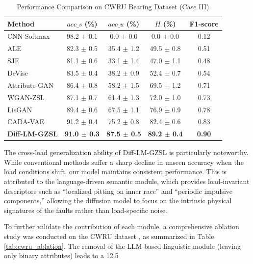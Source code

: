 \begin{table}[ht]
\centering
\caption{Performance Comparison on CWRU Bearing Dataset (Case III)}
\label{tab:cwru_results}
\begin{tabular}{lcccc}
\hline
Method & $acc\_s$ (\%) & $acc\_u$ (\%) & $H$ (\%) & F1-score \\ \hline
CNN-Softmax & 98.2 $\pm$ 0.1 & 0.0 $\pm$ 0.0 & 0.0 $\pm$ 0.0 & 0.12 \\
ALE & 82.3 $\pm$ 0.5 & 35.4 $\pm$ 1.2 & 49.5 $\pm$ 0.8 & 0.51 \\
SJE & 81.1 $\pm$ 0.6 & 33.1 $\pm$ 1.4 & 47.0 $\pm$ 1.1 & 0.48 \\
DeVise & 83.5 $\pm$ 0.4 & 38.2 $\pm$ 0.9 & 52.4 $\pm$ 0.7 & 0.54 \\
Attribute-GAN & 86.4 $\pm$ 0.8 & 58.2 $\pm$ 1.5 & 69.5 $\pm$ 1.2 & 0.71 \\
WGAN-ZSL & 87.1 $\pm$ 0.7 & 61.4 $\pm$ 1.3 & 72.0 $\pm$ 1.0 & 0.73 \\
LisGAN & 89.4 $\pm$ 0.6 & 67.5 $\pm$ 1.1 & 76.9 $\pm$ 0.9 & 0.78 \\
CADA-VAE & 91.2 $\pm$ 0.4 & 75.2 $\pm$ 0.8 & 82.4 $\pm$ 0.6 & 0.83 \\
\textbf{Diff-LM-GZSL} & \textbf{91.0 $\pm$ 0.3} & \textbf{87.5 $\pm$ 0.5} & \textbf{89.2 $\pm$ 0.4} & \textbf{0.90} \\ \hline
\end{tabular}
\end{table}

The cross-load generalization ability of Diff-LM-GZSL is particularly noteworthy. While conventional methods suffer a sharp decline in unseen accuracy when the load conditions shift, our model maintains consistent performance. This is attributed to the language-driven semantic module, which provides load-invariant descriptors such as ``localized pitting on inner race'' and ``periodic impulsive components,'' allowing the diffusion model to focus on the intrinsic physical signatures of the faults rather than load-specific noise.

To further validate the contribution of each module, a comprehensive ablation study was conducted on the CWRU dataset \cite{Downs1993TEP}, as summarized in Table \ref{tab:cwru_ablation}. The removal of the LLM-based linguistic module (leaving only binary attributes) leads to a 12.5%


